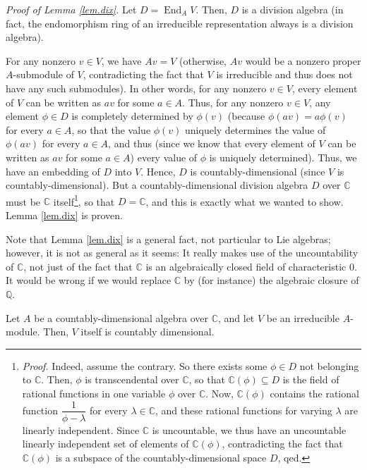 \documentclass[etingof-lie.tex]{subfiles}
\begin{document}
\textit{Proof of Lemma \ref{lem.dix}.} Let $D=\operatorname*{End}%
\nolimits_{A}V$. Then, $D$ is a division algebra (in fact, the endomorphism
ring of an irreducible representation always is a division algebra).

For any nonzero $v\in V$, we have $Av=V$ (otherwise, $Av$ would be a nonzero
proper $A$-submodule of $V$, contradicting the fact that $V$ is irreducible
and thus does not have any such submodules). In other words, for any nonzero
$v\in V$, every element of $V$ can be written as $av$ for some $a\in A$. Thus,
for any nonzero $v\in V$, any element $\phi\in D$ is completely determined by
$\phi\left(  v\right)  $ (because $\phi\left(  av\right)  =a\phi\left(
v\right)  $ for every $a\in A$, so that the value $\phi\left(  v\right)  $
uniquely determines the value of $\phi\left(  av\right)  $ for every $a\in A$,
and thus (since we know that every element of $V$ can be written as $av$ for
some $a\in A$) every value of $\phi$ is uniquely determined). Thus, we have an
embedding of $D$ into $V$. Hence, $D$ is countably-dimensional (since $V$ is
countably-dimensional). But a countably-dimensional division algebra $D$ over
$\mathbb{C}$ must be $\mathbb{C}$ itself\footnote{\textit{Proof.} Indeed,
assume the contrary. So there exists some $\phi\in D$ not belonging to
$\mathbb{C}$. Then, $\phi$ is transcendental over $\mathbb{C}$, so that
$\mathbb{C}\left(  \phi\right)  \subseteq D$ is the field of rational
functions in one variable $\phi$ over $\mathbb{C}$. Now, $\mathbb{C}\left(
\phi\right)  $ contains the rational function $\dfrac{1}{\phi-\lambda}$ for
every $\lambda\in\mathbb{C}$, and these rational functions for varying
$\lambda$ are linearly independent. Since $\mathbb{C}$ is uncountable, we thus
have an uncountable linearly independent set of elements of $\mathbb{C}\left(
\phi\right)  $, contradicting the fact that $\mathbb{C}\left(  \phi\right)  $
is a subspace of the countably-dimensional space $D$, qed.}, so that
$D=\mathbb{C}$, and this is exactly what we wanted to show. Lemma
\ref{lem.dix} is proven.

Note that Lemma \ref{lem.dix} is a general fact, not particular to Lie
algebras; however, it is not as general as it seems: It really makes use of
the uncountability of $\mathbb{C}$, not just of the fact that $\mathbb{C}$ is
an algebraically closed field of characteristic $0$. It would be wrong if we
would replace $\mathbb{C}$ by (for instance) the algebraic closure of
$\mathbb{Q}$.

\begin{remark}
\label{rem.dix}Let $A$ be a countably-dimensional algebra over $\mathbb{C}$,
and let $V$ be an irreducible $A$-module. Then, $V$ itself is countably dimensional.
\end{remark}
\end{document}
